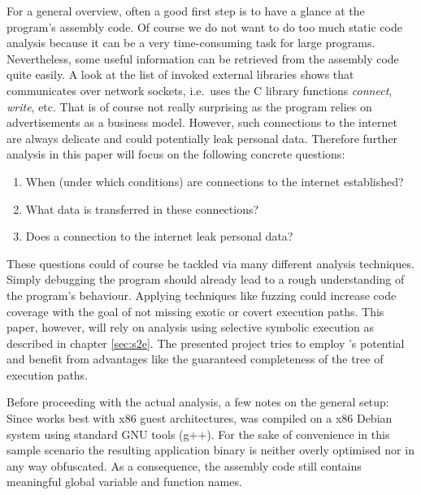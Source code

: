\bigskip
For a general overview, often a good first step is to have a glance at the program's assembly code.
Of course we do not want to do too much static code analysis because it can be a very time-consuming task for large programs.
Nevertheless, some useful information can be retrieved from the assembly code quite easily.
A look at the list of invoked external libraries shows that \app communicates over network sockets, i.e.~uses the C library functions \textit{connect}, \textit{write}, etc.
That is of course not really surprising as the program relies on advertisements as a business model.
However, such connections to the internet are always delicate and could potentially leak personal data.
Therefore further analysis in this paper will focus on the following concrete questions:
\begin{enumerate}
  \item When (under which conditions) are connections to the internet established?
  \item What data is transferred in these connections?
  \item Does a connection to the internet leak personal data?
\end{enumerate}
These questions could of course be tackled via many different analysis techniques.
Simply debugging the program should already lead to a rough understanding of the program's behaviour.
Applying techniques like fuzzing could increase code coverage with the goal of not missing exotic or covert execution paths.
This paper, however, will rely on analysis using selective symbolic execution as described in chapter \ref{sec:s2e}.
The presented project tries to employ \sse's potential and benefit from advantages like the guaranteed completeness of the tree of execution paths.

\bigskip

Before proceeding with the actual analysis, a few notes on the general setup: 
Since \sse works best with x86 guest architectures, \app was compiled on a x86 Debian system using standard GNU tools (g++).
For the sake of convenience in this sample scenario the resulting application binary is neither overly optimised nor in any way obfuscated.
As a consequence, the assembly code still contains meaningful global variable and function names.


\iffalse
§4	Project idea: explore privacy issues in a sample binary
		> Plan darlegen: Programme könnten unerwünscht Infos preisgeben.
		> Daher: Eigenes kleines Programm, das … macht.
\fi